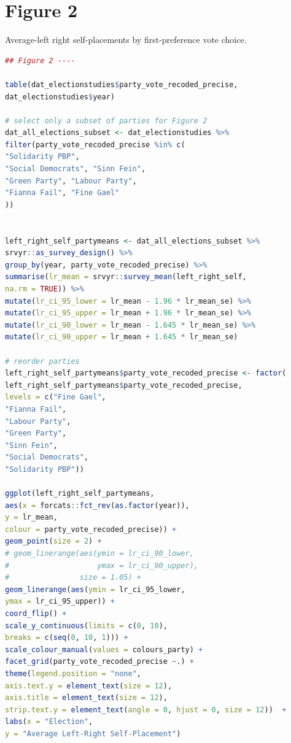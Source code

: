 \documentclass[12pt,letterpaper]{article}
\begin{document}
\newpage

\section*{Figure 2} 
\vspace{.25cm}

Average-left right self-placements by first-preference vote choice.

\begin{lstlisting}[language=R]
## Figure 2 ----

table(dat_electionstudies$party_vote_recoded_precise,
dat_electionstudies$year)

# select only a subset of parties for Figure 2
dat_all_elections_subset <- dat_electionstudies %>% 
filter(party_vote_recoded_precise %in% c(
"Solidarity PBP",
"Social Democrats", "Sinn Fein",
"Green Party", "Labour Party",
"Fianna Fail", "Fine Gael"
))


left_right_self_partymeans <- dat_all_elections_subset %>%
srvyr::as_survey_design() %>% 
group_by(year, party_vote_recoded_precise) %>%
summarise(lr_mean = srvyr::survey_mean(left_right_self, 
na.rm = TRUE)) %>% 
mutate(lr_ci_95_lower = lr_mean - 1.96 * lr_mean_se) %>% 
mutate(lr_ci_95_upper = lr_mean + 1.96 * lr_mean_se) %>% 
mutate(lr_ci_90_lower = lr_mean - 1.645 * lr_mean_se) %>% 
mutate(lr_ci_90_upper = lr_mean + 1.645 * lr_mean_se) 

# reorder parties
left_right_self_partymeans$party_vote_recoded_precise <- factor(
left_right_self_partymeans$party_vote_recoded_precise,
levels = c("Fine Gael", 
"Fianna Fail",
"Labour Party",
"Green Party", 
"Sinn Fein",
"Social Democrats", 
"Solidarity PBP"))

ggplot(left_right_self_partymeans, 
aes(x = forcats::fct_rev(as.factor(year)), 
y = lr_mean,
colour = party_vote_recoded_precise)) +
geom_point(size = 2) +
# geom_linerange(aes(ymin = lr_ci_90_lower,
#                    ymax = lr_ci_90_upper),
#                size = 1.05) +
geom_linerange(aes(ymin = lr_ci_95_lower,
ymax = lr_ci_95_upper)) +
coord_flip() +
scale_y_continuous(limits = c(0, 10), 
breaks = c(seq(0, 10, 1))) +
scale_colour_manual(values = colours_party) +
facet_grid(party_vote_recoded_precise ~.) +
theme(legend.position = "none",
axis.text.y = element_text(size = 12),
axis.title = element_text(size = 12),
strip.text.y = element_text(angle = 0, hjust = 0, size = 12))  +
labs(x = "Election",  
y = "Average Left-Right Self-Placement")

\end{lstlisting}
\end{document}

